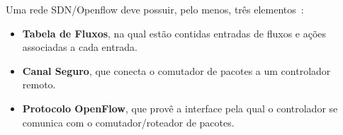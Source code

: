 \documentclass[	12pt, Times, openright, twoside, a4paper, english, brazil]{abntex2}
\begin{document}


Uma rede SDN/Openflow deve possuir, pelo menos, três elementos~\cite{OFSespec}: 
\begin{itemize}
    \item \textbf{Tabela de Fluxos}, na qual estão contidas entradas de fluxos e ações associadas a cada entrada.
    \item \textbf{Canal Seguro}, que conecta o comutador de pacotes a um controlador remoto.
    \item \textbf{Protocolo OpenFlow}, que provê a interface pela qual o controlador se comunica com o comutador/roteador de pacotes. 
\end{itemize}
\end{document}
